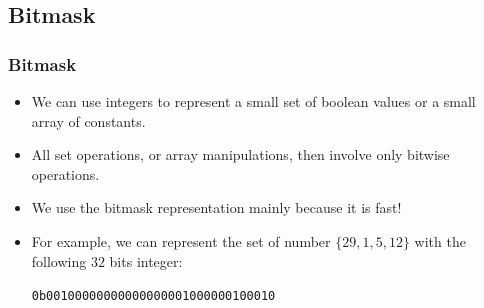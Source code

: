 \documentclass{beamer}
\begin{document}
\subsection{Bitmask}

\hypertarget{sec:datastructure_bitmask}{}

\begin{frame}%
\frametitle{Bitmask}

\begin{itemize}

\item We can use integers to represent a small set of boolean values or a small array of constants.

\vspace{0.2cm}

\item<2-> All set operations, or array manipulations, then involve only bitwise operations.

\vspace{0.2cm}

\item<3-> We use the bitmask representation mainly because it is fast!

\vspace{0.2cm}

\item<4-> For example, we can represent the set of number $\{29, 1, 5, 12\}$ with the following $32$ bits integer:
\vspace{0.1cm}
\begin{center}
\texttt{0b00100000000000000001000000100010}
\end{center}

\end{itemize}

\end{frame}

\end{document}
